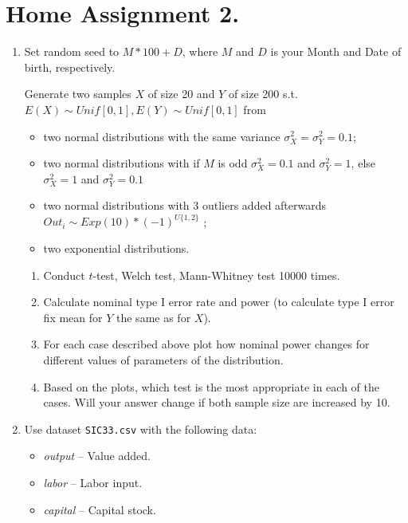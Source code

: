 \documentclass[12pt]{article}
\begin{document}
\section*{Home Assignment 2.}





\begin{enumerate}
	
	\item Set random seed to $M*100 + D$, where $M$ and $D$ is  your Month and Date of birth, respectively.
	
	Generate two samples $X$ of size 20   and $Y$ of size 200 s.t.
	$E(X) \sim Unif[0,1], E(Y) \sim Unif[0,1]$
	from 
	
	\begin{itemize}
		\item two normal distributions with the same variance $\sigma^2_X = \sigma^2_Y = 0.1$;
		\item two normal distributions with 
		if $M$ is odd $\sigma^2_X = 0.1$  and  $\sigma^2_Y = 1$, else
		$\sigma^2_X = 1$  and  $\sigma^2_Y = 0.1$ 
		\item two normal distributions with 3 outliers added afterwards $Out_i \sim Exp(10) * (-1)^{U\{1,2\}}$ ;
		\item two exponential distributions.
	\end{itemize}
	
	
	\begin{enumerate}
		\item Conduct $t$-test, Welch test, Mann-Whitney test 10000 times. 
		\item Calculate nominal type I error rate and power (to calculate type I error fix mean for $Y$ the same as for $X$). 
		\item For each case described above plot how nominal power changes for different values of parameters of the distribution. 
		\item Based on the plots, which test is the most appropriate in each of the cases. Will your answer change if both  sample size are increased by 10.
		
		
	\end{enumerate}

	\item  Use dataset \texttt{SIC33.csv} with the following data:
	
	\begin{itemize}
		\item \textit{output} -- Value added.
		\item  \textit{labor}  -- Labor input.
		\item  \textit{capital} -- Capital stock.
	\end{itemize}
	

\end{enumerate}
\end{document}
